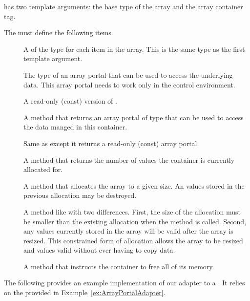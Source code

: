  has two template arguments: the
base type of the array and the array container tag.


The  must define the following items.
\begin{description}
\item[] A  of the type for each item
  in the array. This is the same type as the first template argument.
\item[] The type of an array portal that can be used
  to access the underlying data. This array portal needs to work only in
  the control environment.
\item[] A read-only (const) version of
  .
\item[] A method that returns an array portal of type
   that can be used to access the data manged in this
  container.
\item[] Same as  except it
  returns a read-only (const) array portal.
\item[] A method that returns the number of
  values the container is currently allocated for.
\item[] A method that allocates the array to a given
  size. An values stored in the previous allocation may be destroyed.
\item[] A method like  with two
  differences. First, the size of the allocation must be smaller than the
  existing allocation when the method is called. Second, any values
  currently stored in the array will be valid after the array is
  resized. This constrained form of allocation allows the array to be
  resized and values valid without ever having to copy data.
\item[] A method that instructs the container to
  free all of its memory.
\end{description}

The following provides an example implementation of our adapter to a
. It relies on the
 provided in
Example~\ref{ex:ArrayPortalAdapter}.

